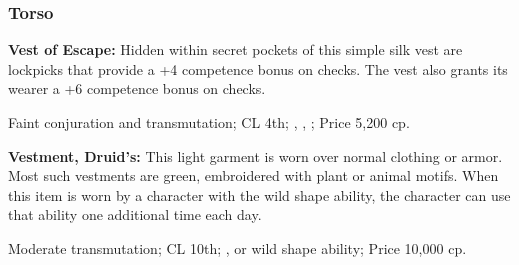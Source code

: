\subsubsection{Torso}

\textbf{Vest of Escape:} Hidden within secret pockets of this simple silk vest are lockpicks that provide a +4 competence bonus on  checks. The vest also grants its wearer a +6 competence bonus on  checks.

Faint conjuration and transmutation; CL 4th; , , ; Price 5,200 cp.

\textbf{Vestment, Druid's:} This light garment is worn over normal clothing or armor. Most such vestments are green, embroidered with plant or animal motifs. When this item is worn by a character with the wild shape ability, the character can use that ability one additional time each day.

Moderate transmutation; CL 10th; ,  or wild shape ability; Price 10,000 cp.
